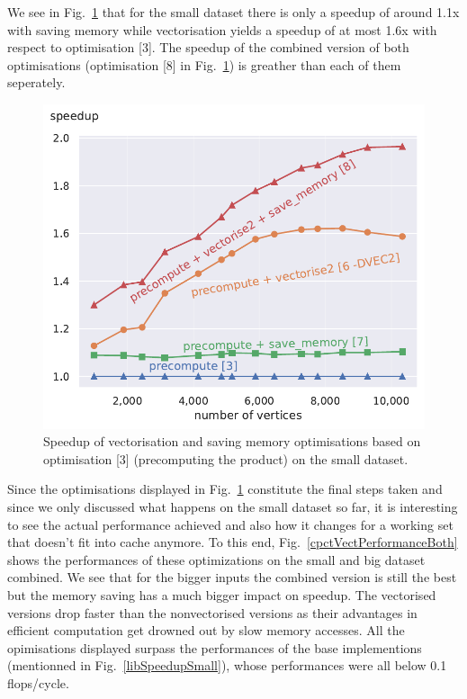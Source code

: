 \documentclass[letterpaper]{article}
\begin{document}
We see in Fig.~\ref{cpctVectSpeedupSmall} that for the small dataset there is only a speedup of around 1.1x with saving memory while vectorisation yields a speedup of at most 1.6x with respect to optimisation [3].
The speedup of the combined version of both optimisations (optimisation [8] in Fig.~\ref{cpctVectSpeedupSmall}) is greather than each of them seperately.
\begin{figure}\centering
	\includegraphics[scale=0.59]{img/speedup[3][6][7][8]_small.pdf}
	\caption{Speedup of vectorisation and saving memory optimisations based on optimisation [3] (precomputing the product) on the small dataset. \label{cpctVectSpeedupSmall}}
\end{figure}
Since the optimisations displayed in Fig.~\ref{cpctVectSpeedupSmall} constitute the final steps taken and since we only discussed what happens on the small dataset so far, it is interesting to see the actual performance achieved and also how it changes for a working set that doesn't fit into cache anymore.
To this end, Fig.~\ref{cpctVectPerformanceBoth} shows the performances of these optimizations on the small and big dataset combined.
We see that for the bigger inputs the combined version is still the best but the memory saving has a much bigger impact on speedup.
The vectorised versions drop faster than the nonvectorised versions as their advantages in efficient computation get drowned out by slow memory accesses.
All the opimisations displayed surpass the performances of the base implementions (mentionned in Fig.~\ref{libSpeedupSmall}), whose performances were all below 0.1 flops/cycle.
\end{document}
